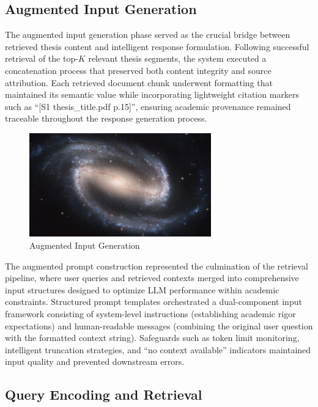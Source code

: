 \begin{refsection}
\subsection{Augmented Input Generation}
The augmented input generation phase served as the crucial bridge between retrieved thesis content and intelligent response formulation. Following successful retrieval of the top-$K$ relevant thesis segments, the system executed a concatenation process that preserved both content integrity and source attribution. Each retrieved document chunk underwent formatting that maintained its semantic value while incorporating lightweight citation markers such as ``[S1 thesis\_title.pdf p.15]'', ensuring academic provenance remained traceable throughout the response generation process.

\begin{figure}[h]
    \centering
    \includegraphics[width=0.7\textwidth]{figures/sampleFig1.jpg}
    \caption{Augmented Input Generation}
\end{figure}

The augmented prompt construction represented the culmination of the retrieval pipeline, where user queries and retrieved contexts merged into comprehensive input structures designed to optimize LLM performance within academic constraints. Structured prompt templates orchestrated a dual-component input framework consisting of system-level instructions (establishing academic rigor expectations) and human-readable messages (combining the original user question with the formatted context string). Safeguards such as token limit monitoring, intelligent truncation strategies, and ``no context available'' indicators maintained input quality and prevented downstream errors.

\subsection{Query Encoding and Retrieval}


\end{refsection}
